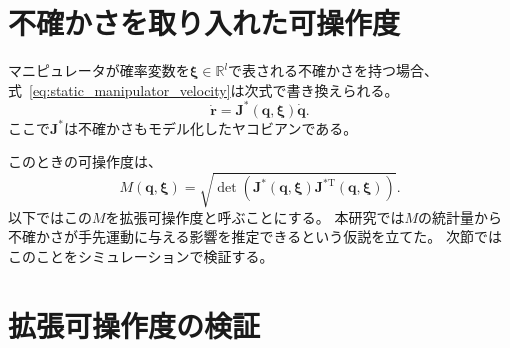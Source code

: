 \documentclass[10pt,a4j,twocolumn]{ltjsarticle}
\begin{document}
\section{不確かさを取り入れた可操作度}

マニピュレータが確率変数を$\bm{\xi} \in \mathbb{R}^{l}$で表される不確かさを持つ場合、式~\eqref{eq:static_manipulator_velocity}は次式で書き換えられる。
\begin{equation}
  \dot{\bm{r}} = \bm{J}^{*}(\bm{q}, \bm{\xi}) \dot{\bm{q}}. \label{eq:static_manipulator_velocity_with_uncertainty}
\end{equation}
ここで$\bm{J}^{*}$は不確かさもモデル化したヤコビアンである。

このときの可操作度は、
\begin{equation}
  M(\bm{q}, \bm{\xi}) = \sqrt{\det \left( \bm{J}^{*}(\bm{q}, \bm{\xi}) \bm{J}^{*\mathrm{T}}(\bm{q}, \bm{\xi}) \right)}.
\end{equation}
以下ではこの$M$を拡張可操作度と呼ぶことにする。
本研究では$M$の統計量から不確かさが手先運動に与える影響を推定できるという仮説を立てた。
次節ではこのことをシミュレーションで検証する。

\section{拡張可操作度の検証}
\end{document}
